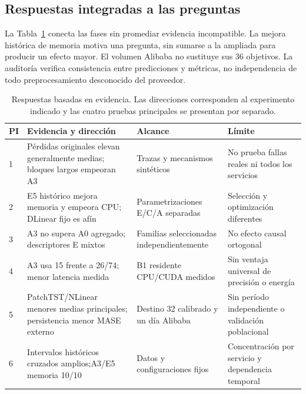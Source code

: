 \subsection{Respuestas integradas a las preguntas}
La Tabla~\ref{tab:rq} conecta las fases sin promediar evidencia incompatible. La mejora histórica de memoria motiva una pregunta, sin sumarse a la ampliada para producir un efecto mayor. El volumen Alibaba no sustituye sus 36 objetivos. La auditoría verifica consistencia entre predicciones y métricas, no independencia de todo preprocesamiento desconocido del proveedor.
\begin{table}[!t]
\caption{Respuestas basadas en evidencia. Las direcciones corresponden al experimento indicado y las cuatro pruebas principales se presentan por separado.}\label{tab:rq}
\centering\footnotesize
\begin{tabularx}{\linewidth}{p{.07\linewidth}XXX}
\toprule PI & Evidencia y dirección & Alcance & Límite \\\midrule
1 & Pérdidas originales elevan generalmente medias; bloques largos empeoran A3 & Trazas y mecanismos sintéticos & No prueba fallas reales ni todos los servicios \\
2 & E5 histórico mejora memoria y empeora CPU; DLinear fijo es afín & Parametrizaciones E/C/A separadas & Selección y optimización diferentes \\
3 & A3 no supera A0 agregado; descriptores E mixtos & Familias seleccionadas independientemente & No efecto causal ortogonal \\
4 & A3 usa 15 frente a 26/74; menor latencia medida & B1 residente CPU/CUDA medidos & Sin ventaja universal de precisión o energía \\
5 & PatchTST/NLinear menores medias principales; persistencia menor MASE externo & Destino 32 calibrado y un día Alibaba & Sin período independiente o validación poblacional \\
6 & Intervalos históricos cruzados amplios;A3/E5 memoria 10/10 & Datos y configuraciones fijos & Concentración por servicio y dependencia temporal \\
\bottomrule\end{tabularx}
\end{table}
